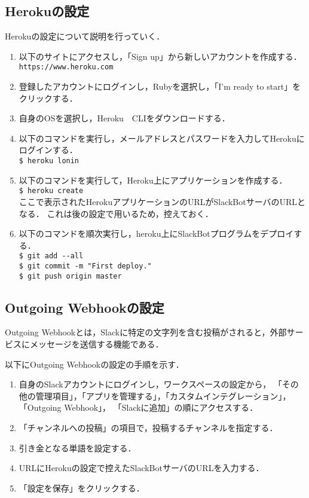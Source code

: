 \documentclass[12pt]{jsarticle}
\begin{document}
\subsection{Herokuの設定}
Herokuの設定について説明を行っていく．

\begin{enumerate}
  \item 以下のサイトにアクセスし，「Sign up」から新しいアカウントを作成する．\\
        \verb|https://www.heroku.com|
  \item 登録したアカウントにログインし，Rubyを選択し，「I'm ready to start」をクリックする．
  \item 自身のOSを選択し，Heroku　CLIをダウンロードする．
  \item 以下のコマンドを実行し，メールアドレスとパスワードを入力してHerokuにログインする．\\
        \verb|$ heroku lonin|
  \item 以下のコマンドを実行して，Heroku上にアプリケーションを作成する．\\
        \verb|$ heroku create|\\
        ここで表示されたHerokuアプリケーションのURLがSlackBotサーバのURLとなる．
        これは後の設定で用いるため，控えておく．
  \item 以下のコマンドを順次実行し，heroku上にSlackBotプログラムをデプロイする．\\
        \verb|$ git add --all|\\
        \verb|$ git commit -m "First deploy."|\\
        \verb|$ git push origin master|
\end{enumerate}


\subsection{Outgoing Webhookの設定}
Outgoing Webhookとは，Slackに特定の文字列を含む投稿がされると，外部サービスにメッセージを送信する機能である．

以下にOutgoing Webhookの設定の手順を示す． 
\begin{enumerate}
  \item 自身のSlackアカウントにログインし，ワークスペースの設定から，
  「その他の管理項目」，「アプリを管理する」，「カスタムインテグレーション」，「Outgoing Webhook」，
  「Slackに追加」の順にアクセスする．
  \item 「チャンネルへの投稿」の項目で，投稿するチャンネルを指定する．　
  \item 引き金となる単語を設定する．
  \item URLにHerokuの設定で控えたSlackBotサーバのURLを入力する．
  \item 「設定を保存」をクリックする．
\end{enumerate}
\end{document}

